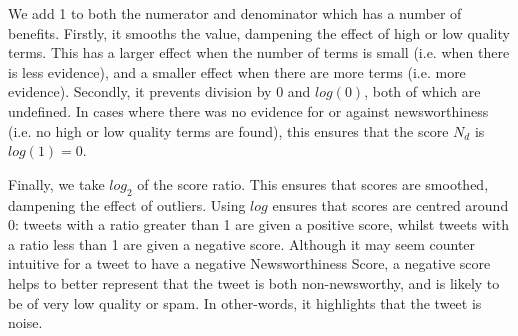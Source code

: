 We add 1 to both the numerator and denominator which has a number of benefits.
Firstly, it smooths the value, dampening the effect of high or low quality terms.
This has a larger effect when the number of terms is small (i.e. when there is less evidence), and a smaller effect when there are more terms (i.e. more evidence).
Secondly, it prevents division by 0 and \(log(0)\), both of which are undefined.
In cases where there was no evidence for or against newsworthiness (i.e. no high or low quality terms are found), this ensures that the score \(N_d\) is \(log(1) = 0 \).

Finally, we take \(log_2\) of the score ratio.
This ensures that scores are smoothed, dampening the effect of outliers.
Using \(log\) ensures that scores are centred around 0: tweets with a ratio greater than 1 are given a positive score, whilst tweets with a ratio less than 1 are given a negative score.
Although it may seem counter intuitive for a tweet to have a negative Newsworthiness Score, a negative score helps to better represent that the tweet is both non-newsworthy, and is likely to be of very low quality or spam. In other-words, it highlights that the tweet is noise.
